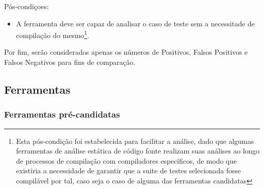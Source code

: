 Pós-condiçoes:
\begin{itemize}
  \item A ferramenta deve ser capaz de analisar o caso de teste sem a necessitade de compilação do mesmo\footnote{Esta pós-condição foi estabelecida para facilitar a análise, dado que algumas ferramentas de análise estática de código fonte realizam suas análises ao longo de processos de compilação com compiladores específicos, de modo que existiria a necessidade de garantir que a suite de testes selecionada fosse compilável por tal, caso seja o caso de alguma das ferramentas candidatas}.
\end{itemize}

Por fim, serão considerados apenas os números de Positivos, Falsos Positivos e Falsos Negativos para fins de comparação.

\subsection{Ferramentas}

\subsubsection{Ferramentas pré-candidatas}

